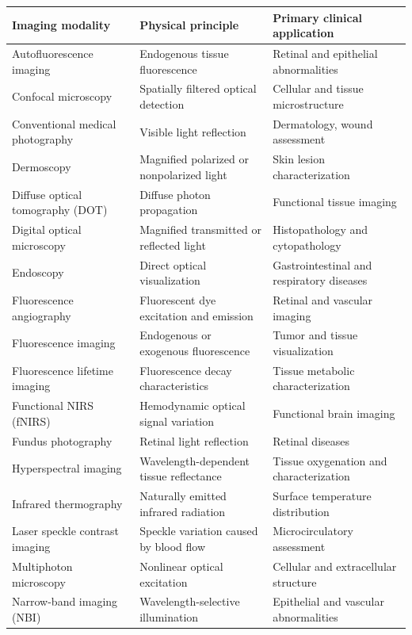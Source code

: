 \begin{center}
\begin{tabular}{@{}p{}p{}p{}@{}}
\toprule
\textbf{Imaging modality} & \textbf{Physical principle} & \textbf{Primary clinical application} \\
\midrule
Autofluorescence imaging & Endogenous tissue fluorescence & Retinal and epithelial abnormalities \\
Confocal microscopy & Spatially filtered optical detection & Cellular and tissue microstructure \\
Conventional medical photography & Visible light reflection & Dermatology, wound assessment \\
Dermoscopy & Magnified polarized or nonpolarized light & Skin lesion characterization \\
Diffuse optical tomography (DOT) & Diffuse photon propagation & Functional tissue imaging \\
Digital optical microscopy & Magnified transmitted or reflected light & Histopathology and cytopathology \\
Endoscopy & Direct optical visualization & Gastrointestinal and respiratory diseases \\
Fluorescence angiography & Fluorescent dye excitation and emission & Retinal and vascular imaging \\
Fluorescence imaging & Endogenous or exogenous fluorescence & Tumor and tissue visualization \\
Fluorescence lifetime imaging & Fluorescence decay characteristics & Tissue metabolic characterization \\
Functional NIRS (fNIRS) & Hemodynamic optical signal variation & Functional brain imaging \\
Fundus photography & Retinal light reflection & Retinal diseases \\
Hyperspectral imaging & Wavelength-dependent tissue reflectance & Tissue oxygenation and characterization \\
Infrared thermography & Naturally emitted infrared radiation & Surface temperature distribution \\
Laser speckle contrast imaging & Speckle variation caused by blood flow & Microcirculatory assessment \\
Multiphoton microscopy & Nonlinear optical excitation & Cellular and extracellular structure \\
Narrow-band imaging (NBI) & Wavelength-selective illumination & Epithelial and vascular abnormalities \\

\end{tabular}
\end{center}
